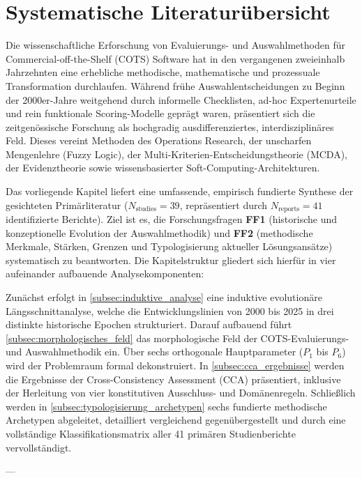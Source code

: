 \section{Systematische Literaturübersicht}
\label{sec:systematische_literaturuebersicht}

Die wissenschaftliche Erforschung von Evaluierungs- und Auswahlmethoden für Commercial-off-the-Shelf (COTS) Software hat in den vergangenen zweieinhalb Jahrzehnten eine erhebliche methodische, mathematische und prozessuale Transformation durchlaufen. Während frühe Auswahlentscheidungen zu Beginn der 2000er-Jahre weitgehend durch informelle Checklisten, ad-hoc Expertenurteile und rein funktionale Scoring-Modelle geprägt waren, präsentiert sich die zeitgenössische Forschung als hochgradig ausdifferenziertes, interdisziplinäres Feld. Dieses vereint Methoden des Operations Research, der unscharfen Mengenlehre (Fuzzy Logic), der Multi-Kriterien-Entscheidungstheorie (MCDA), der Evidenztheorie sowie wissensbasierter Soft-Computing-Architekturen.

Das vorliegende Kapitel liefert eine umfassende, empirisch fundierte Synthese der gesichteten Primärliteratur ($N_{\text{studies}} = 39$, repräsentiert durch $N_{\text{reports}} = 41$ identifizierte Berichte). Ziel ist es, die Forschungsfragen \textbf{FF1} (historische und konzeptionelle Evolution der Auswahlmethodik) und \textbf{FF2} (methodische Merkmale, Stärken, Grenzen und Typologisierung aktueller Lösungsansätze) systematisch zu beantworten. Die Kapitelstruktur gliedert sich hierfür in vier aufeinander aufbauende Analysekomponenten:

Zunächst erfolgt in \autoref{subsec:induktive_analyse} eine induktive evolutionäre Längsschnittanalyse, welche die Entwicklungslinien von 2000 bis 2025 in drei distinkte historische Epochen strukturiert. Darauf aufbauend führt \autoref{subsec:morphologisches_feld} das morphologische Feld der COTS-Evaluierungs- und Auswahlmethodik ein. Über sechs orthogonale Hauptparameter ($P_1$ bis $P_6$) wird der Problemraum formal dekonstruiert. In \autoref{subsec:cca_ergebnisse} werden die Ergebnisse der Cross-Consistency Assessment (CCA) präsentiert, inklusive der Herleitung von vier konstitutiven Ausschluss- und Domänenregeln. Schließlich werden in \autoref{subsec:typologisierung_archetypen} sechs fundierte methodische Archetypen abgeleitet, detailliert vergleichend gegenübergestellt und durch eine vollständige Klassifikationsmatrix aller 41 primären Studienberichte vervollständigt.

---

